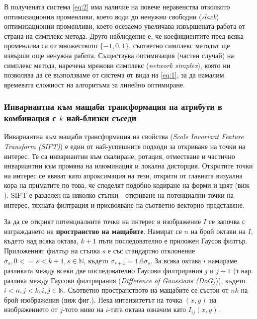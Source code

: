 \documentclass[a4paper,12pt]{article}
\begin{document}
\bigbreak

В получената система \ref{eq:2} има наличие на повече неравенства отколкото оптимизационни променливи, което води до ненужни свободни (\textit{slack}) оптимизационни променливи, което осезаемо увеличава извършената работа от страна на симплекс метода. Друго наблюдение е, че коефициентите пред всяка променлива са от множеството $\{-1, 0, 1\}$, съответно симплекс методът ще извърши още ненужна работа. Съществува оптимизация (частен случай) на симплекс метода, наречена мрежови симплекс (\textit{network simplex}), която ни позволява да се възползваме от система от вида на \ref{eq:1}, за да намалим времевата сложност на алгоритъма за линейно оптимиране.

\bigbreak




\subsubsection{Инвариантна към мащаби трансформация на атрибути в комбинация с $k$ най-близки съседи}

Инвариантна към мащаби трансформация на свойства (\textit{Scale Invariant Feature Transform (SIFT)}) е един от най-успешните подходи за откриване на точки на интерес. Те са инвариантни към скалиране, ротация, отместване и частично инвариантни към промяна на илюминация и локална дисторция.  Откритите точки на интерес се явяват като апроксимация на тези, открити от главната визуална кора на приматите по това, че споделят подобно кодиране на форми и цвят (виж \cite{primatevisualcortex}). SIFT е разделен на няколко стъпки - откриване на потенциални точки на интерес, тяхната филтрация и присвояване на съответно векторно представяне.

\bigbreak

За да се открият потенциалните точки на интерес в изображение $I$ се започва с изграждането на \textbf{пространство на мащабите}. Намират се $n$ на брой октави на $I$, където над всяка октава, $k+1$ пъти последователно е приложен Гаусов филтър. Приложеният филтър на стъпка $s$ е със стандартно отклонение $\sigma_s, 0 <= s < k+1, s \in \mathbb{N}$, където $\sigma_{s+1} = 1.6 \sigma_s$. За всяка октава $i$ намираме разликата между всеки две последователно Гаусови филтрирания $j$ и $j+1$ (т.нар. разлика между Гаусови филтрирания (\textit{Difference of Gaussians (DoG)})), където $i < n, j < k, i, j \in \mathbb{N}$. Съответно пространството на мащабите се състои от $nk$ на брой изображения (виж фиг.). Нека интензитетът на точка $(x, y)$ на изображението от $j$-тото ниво на $i$-тата октава означим като $I_{ij}(x,y)$.
\end{document}
